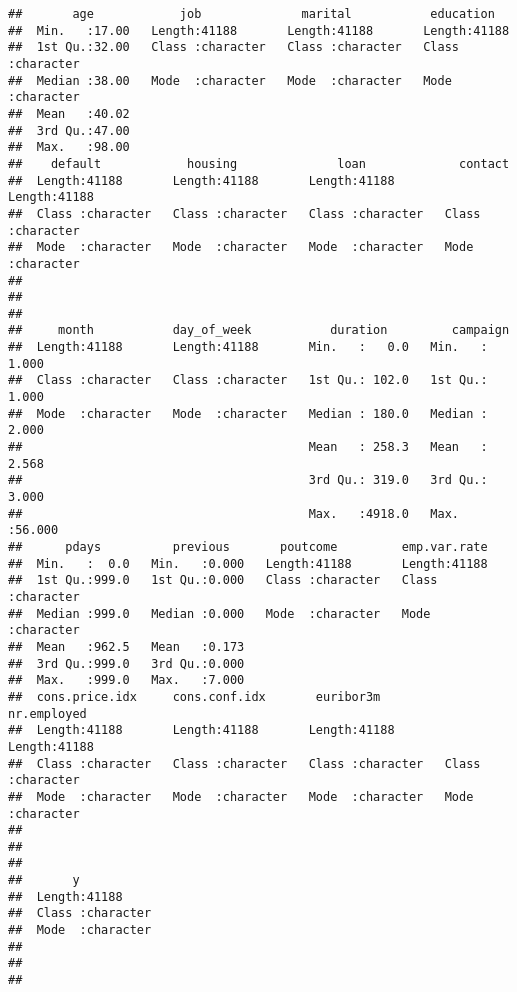 \documentclass[
]{article}
\begin{document}
\begin{verbatim}
##       age            job              marital           education        
##  Min.   :17.00   Length:41188       Length:41188       Length:41188      
##  1st Qu.:32.00   Class :character   Class :character   Class :character  
##  Median :38.00   Mode  :character   Mode  :character   Mode  :character  
##  Mean   :40.02                                                           
##  3rd Qu.:47.00                                                           
##  Max.   :98.00                                                           
##    default            housing              loan             contact         
##  Length:41188       Length:41188       Length:41188       Length:41188      
##  Class :character   Class :character   Class :character   Class :character  
##  Mode  :character   Mode  :character   Mode  :character   Mode  :character  
##                                                                             
##                                                                             
##                                                                             
##     month           day_of_week           duration         campaign     
##  Length:41188       Length:41188       Min.   :   0.0   Min.   : 1.000  
##  Class :character   Class :character   1st Qu.: 102.0   1st Qu.: 1.000  
##  Mode  :character   Mode  :character   Median : 180.0   Median : 2.000  
##                                        Mean   : 258.3   Mean   : 2.568  
##                                        3rd Qu.: 319.0   3rd Qu.: 3.000  
##                                        Max.   :4918.0   Max.   :56.000  
##      pdays          previous       poutcome         emp.var.rate      
##  Min.   :  0.0   Min.   :0.000   Length:41188       Length:41188      
##  1st Qu.:999.0   1st Qu.:0.000   Class :character   Class :character  
##  Median :999.0   Median :0.000   Mode  :character   Mode  :character  
##  Mean   :962.5   Mean   :0.173                                        
##  3rd Qu.:999.0   3rd Qu.:0.000                                        
##  Max.   :999.0   Max.   :7.000                                        
##  cons.price.idx     cons.conf.idx       euribor3m         nr.employed       
##  Length:41188       Length:41188       Length:41188       Length:41188      
##  Class :character   Class :character   Class :character   Class :character  
##  Mode  :character   Mode  :character   Mode  :character   Mode  :character  
##                                                                             
##                                                                             
##                                                                             
##       y            
##  Length:41188      
##  Class :character  
##  Mode  :character  
##                    
##                    
## 
\end{verbatim}
\end{document}
